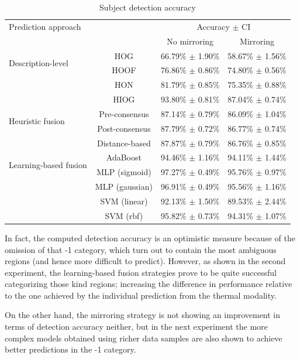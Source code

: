 \documentclass[10pt,twocolumn,letterpaper]{article}
\begin{document}
\begin{table}[ht]
\caption{Subject detection accuracy}
\begin{center}
\begin{tabular}{lccc}
    \hline
   Prediction approach & &  \multicolumn{2}{c}{Accuracy $\pm$ CI} \\
   \cline{3-4}
    & & No mirroring & Mirroring\\
    \hline
    \multirow{2}{*}{Description-level} & HOG & 66.79\% $\pm$ 1.90\% & 58.67\% $\pm$ 1.56\% \\
    & HOOF & 76.86\% $\pm$ 0.86\% & 74.80\% $\pm$ 0.56\% \\
    & HON & 81.79\% $\pm$ 0.85\% & 75.35\% $\pm$ 0.88\% \\
    & HIOG & 93.80\% $\pm$ 0.81\% & 87.04\% $\pm$ 0.74\% \\
    \hline
    \multirow{2}{*}{Heuristic fusion} & Pre-consensus & 87.14\% $\pm$ 0.79\% & 86.09\% $\pm$ 1.04\% \\
    & Post-consensus & 87.79\% $\pm$ 0.72\% & 86.77\% $\pm$ 0.74\% \\
    & Distance-based & 87.87\% $\pm$ 0.79\% & 86.76\% $\pm$ 0.85\% \\
    \hline
    \multirow{2}{*}{Learning-based fusion} & AdaBoost & 94.46\% $\pm$ 1.16\% & 94.11\% $\pm$ 1.44\% \\
    & MLP (sigmoid) & 97.27\% $\pm$ 0.49\% & 95.76\% $\pm$ 0.97\% \\
    & MLP (gaussian) & 96.91\% $\pm$ 0.49\% & 95.56\% $\pm$ 1.16\% \\
    & SVM (linear) & 92.13\% $\pm$ 1.50\% & 89.53\% $\pm$ 2.44\% \\
    & SVM (rbf) & 95.82\% $\pm$ 0.73\% & 94.31\% $\pm$ 1.07\%\\
    \hline
\end{tabular}
\end{center}
\label{tab:subject_detection_accuracy}
\end{table}

In fact, the computed detection accuracy is an optimistic measure because of the omission of that -1 category, which turn out to contain the most ambiguous regions (and hence more difficult to predict). However, as shown in the second experiment, the learning-based fusion strategies prove to be quite successful categorizing those kind regions; increasing the difference in performance relative to the one achieved by the individual prediction from the thermal modality. 

On the other hand, the mirroring strategy is not showing an improvement in terms of detection accuracy neither, but in the next experiment the more complex models obtained using richer data samples are also shown to achieve better predictions in the -1 category.
\end{document}
